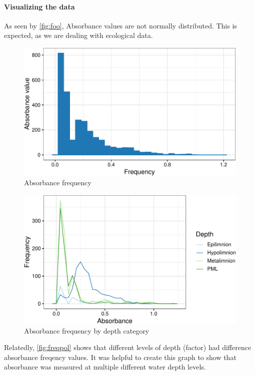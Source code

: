 \documentclass[12pt,]{article}
\let\oldparagraph\paragraph
\renewcommand{\paragraph}[1]{\oldparagraph{#1}\mbox{}}
\begin{document}
\paragraph{Visualizing the data}\label{visualizing-the-data}

As seen by \autoref{fig:foo}, Absorbance values are not normally
distributed. This is expected, as we are dealing with ecological data.

\begin{figure}
\centering
\includegraphics{Bash_ENV872_Project_files/figure-latex/foo-1.pdf}
\caption{\label{fig:foo}Absorbance frequency}
\end{figure}

\begin{figure}
\centering
\includegraphics{Bash_ENV872_Project_files/figure-latex/freqpol-1.pdf}
\caption{\label{fig:freqpol}Absorbance frequency by depth category}
\end{figure}

Relatedly, \autoref{fig:freqpol} shows that different levels of depth
(factor) had difference absorbance freqency values. It was helpful to
create this graph to show that absorbance was measured at multiple
different water depth levels.
\end{document}
